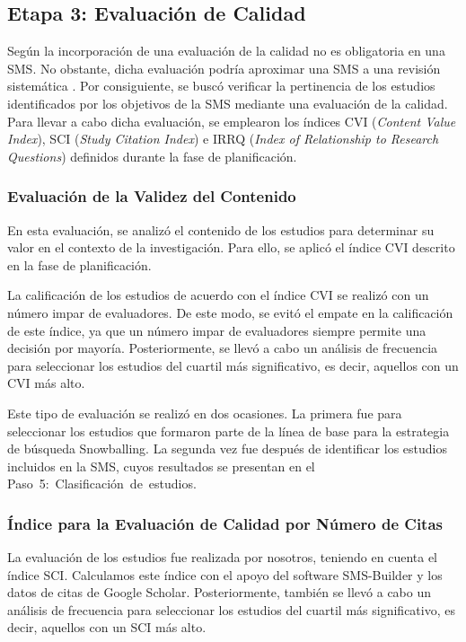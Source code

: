 %

\subsection{Etapa 3: Evaluación de Calidad}
Según \cite{Ali-01} la incorporación de una evaluación de la calidad no es obligatoria en una SMS. No obstante, dicha evaluación podría aproximar una SMS a una revisión sistemática \cite{Petersen-01}. Por consiguiente, se buscó verificar la pertinencia de los estudios identificados por los objetivos de la SMS mediante una evaluación de la calidad. Para llevar a cabo dicha evaluación, se emplearon los índices CVI (\textit{Content Value Index}), SCI (\textit{Study Citation Index}) e IRRQ (\textit{Index of Relationship to Research Questions}) definidos durante la fase de planificación.

\subsubsection{Evaluación de la Validez del Contenido}
En esta evaluación, se analizó el contenido de los estudios para determinar su valor en el contexto de la investigación. Para ello, se aplicó el índice CVI descrito en la fase de planificación.

La calificación de los estudios de acuerdo con el índice CVI se realizó con un número impar de evaluadores. De este modo, se evitó el empate en la calificación de este índice, ya que un número impar de evaluadores siempre permite una decisión por mayoría. Posteriormente, se llevó a cabo un análisis de frecuencia para seleccionar los estudios del cuartil más significativo, es decir, aquellos con un CVI más alto.

Este tipo de evaluación se realizó en dos ocasiones. La primera fue para seleccionar los estudios que formaron parte de la línea de base para la estrategia de búsqueda Snowballing. La segunda vez fue después de identificar los \totalEtapaDos{} estudios incluidos en la SMS, cuyos resultados se presentan en el \hbox{Paso 5: Clasificación de estudios.}


\subsubsection{Índice para la Evaluación de Calidad por Número de Citas}
La evaluación de los estudios fue realizada por nosotros, teniendo en cuenta el índice SCI. Calculamos este índice con el apoyo del software SMS-Builder \cite{sms-builder-repo} y los datos de citas de Google Scholar. Posteriormente, también se llevó a cabo un análisis de frecuencia para seleccionar los estudios del cuartil más significativo, es decir, aquellos con un SCI más alto.


